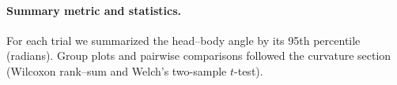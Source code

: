 \paragraph{Summary metric and statistics.}
For each trial we summarized the head–body angle by its 95th percentile (radians). Group plots and pairwise comparisons followed the curvature section (Wilcoxon rank–sum and Welch’s two-sample $t$-test).










